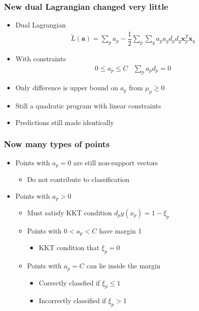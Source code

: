 \documentclass[12pt,notes,mathserif]{beamer}
\begin{document}
\begin{frame}[c]
\frametitle{New dual Lagrangian changed very little}
\begin{itemize}
\item Dual Lagrangian
\begin{gather*}
\tilde{L}(\mathbf{a})=\sum_pa_p-\dfrac{1}{2}\sum_p\sum_qa_pa_qd_pd_q\mathbf{x}_p^T\mathbf{x}_q
\end{gather*}
\item With constraints
\[\begin{matrix}
0\leqslant{}a_p\leqslant{}C&\sum\limits_pa_pd_p=0
\end{matrix}\]
\item Only difference is upper bound on $a_p$ from $\mu_p \geqslant{}0$
\item Still a quadratic program with linear constraints
\item Predictions still made identically
\end{itemize}
\end{frame}



\begin{frame}[c]
\frametitle{Now many types of points}
\begin{itemize}
\item Points with $a_p= 0$ are still non-support vectors
\begin{itemize}
\item Do not contribute to classification
\end{itemize}
\item Points with $a_p>0$
\begin{itemize}
\item Must satisfy KKT condition $d_py(x_p)=1-\xi_p$
\item Points with $0 < a_p < C$ have margin 1
\begin{itemize}
\item KKT condition that $\xi_p=0$
\end{itemize}
\item Points with $a_p=C$ can lie inside the margin
\begin{itemize}
\item Correctly classfied if $\xi_p\leqslant{}1$
\item Incorrectly classified if $\xi_p>1$
\end{itemize}
\end{itemize}
\end{itemize}
\end{frame}
\end{document}
